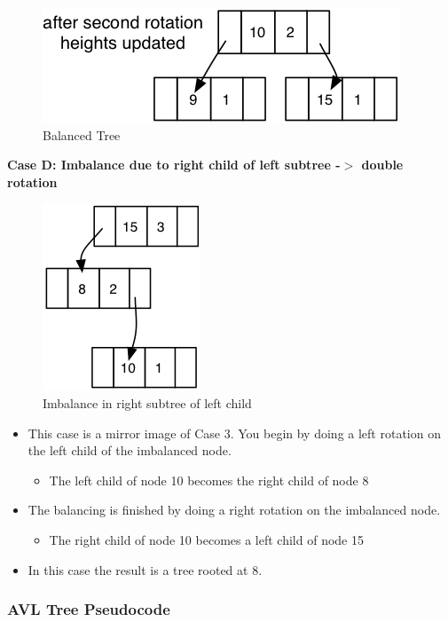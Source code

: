 \begin{figure}[H]
\centering
\includegraphics{pictures/tree21.png}
\caption{Balanced Tree}
\label{fig:tree21}
\end{figure}



\textbf{Case D: Imbalance due to right child of left subtree -$>$ double rotation}

\begin{figure}[H]
\centering
\includegraphics{pictures/tree22.png}
\caption{Imbalance in right subtree of left child}
\label{fig:tree22}
\end{figure}
\begin{itemize}
	\item This case is a mirror image of Case 3. You begin by doing a left rotation on the left child of the imbalanced node.
\begin{itemize}
	\item The left child of node 10 becomes the right child of node 8
\end{itemize}
	\item The balancing is finished by doing a right rotation on the imbalanced node.
\begin{itemize}
	\item The right child of node 10 becomes a left child of node 15
\end{itemize}
	\item In this case the result is a tree rooted at 8.
\end{itemize}



\subsubsection{AVL Tree Pseudocode}

